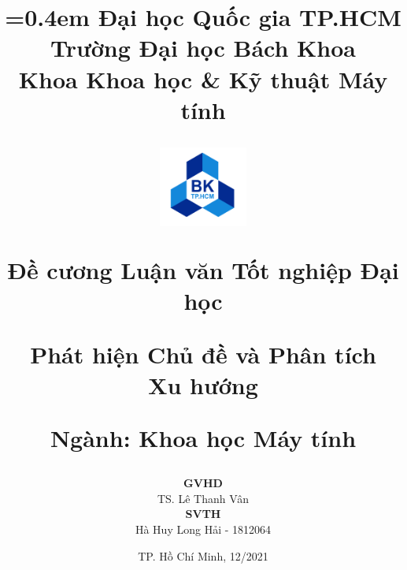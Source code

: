 \title{
	{\parskip=0.4em\Large
			Đại học Quốc gia TP.HCM\\[-0.2em]
			Trường Đại học Bách Khoa\\[-0.2em]
			Khoa Khoa học \& Kỹ thuật Máy tính\\
		}
	\vspace{0.5cm}
	\begin{figure}[!ht]
		\centering
		\includegraphics[width=0.26\textwidth]{img/logo/LogoBKChinhThuc.png}
	\end{figure}
	\vspace{0.1cm}
	{\Large Đề cương Luận văn Tốt nghiệp Đại học} \\
	\vspace{0.3cm}

	\Huge \textbf{\renewcommand{\baselinestretch}{0.1}
		Phát hiện Chủ đề và Phân tích\\[-0.2em]Xu hướng}

	\vspace{0.2cm}
	
	\large{Ngành: Khoa học Máy tính}

	\vspace{0.3cm}

}
\author{
	\large
		\textbf{GVHD}\\[0.2em]
		TS. Lê Thanh Vân\\[1.5em]
		\textbf{SVTH}\\[0.2em]
		Hà Huy Long Hải - 1812064\\
}



\date{
	\normalsize{TP. Hồ Chí Minh, 12/2021}
}

\maketitle
\thispagestyle{empty}
